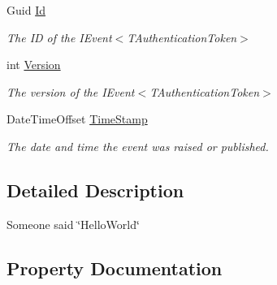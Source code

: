 \begin{DoxyCompactItemize}
Guid \hyperlink{classCqrs_1_1Akka_1_1Tests_1_1Unit_1_1Events_1_1HelloWorldSaid_acb6e5f3f56de3edae8e022d19a2cbc09_acb6e5f3f56de3edae8e022d19a2cbc09}{Id}
\begin{DoxyCompactList}\small\item\em The ID of the I\+Event$<$\+T\+Authentication\+Token$>$ \end{DoxyCompactList}\item 
int \hyperlink{classCqrs_1_1Akka_1_1Tests_1_1Unit_1_1Events_1_1HelloWorldSaid_a31c7b70656767f90229171b579cba13c_a31c7b70656767f90229171b579cba13c}{Version}
\begin{DoxyCompactList}\small\item\em The version of the I\+Event$<$\+T\+Authentication\+Token$>$ \end{DoxyCompactList}\item 
Date\+Time\+Offset \hyperlink{classCqrs_1_1Akka_1_1Tests_1_1Unit_1_1Events_1_1HelloWorldSaid_aa5025874b17575c910573f1ed6a70bc3_aa5025874b17575c910573f1ed6a70bc3}{Time\+Stamp}
\begin{DoxyCompactList}\small\item\em The date and time the event was raised or published. \end{DoxyCompactList}\end{DoxyCompactItemize}


\subsection{Detailed Description}
Someone said \char`\"{}\+Hello\+World\char`\"{} 



\subsection{Property Documentation}
\mbox{\label{classCqrs_1_1Akka_1_1Tests_1_1Unit_1_1Events_1_1HelloWorldSaid_a22e519c1d838d43d06c8dc5ce820ce6f_a22e519c1d838d43d06c8dc5ce820ce6f}} 
